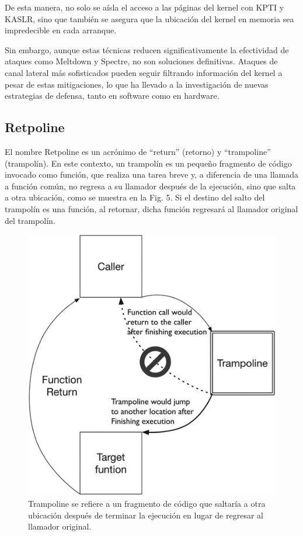 \documentclass[lettersize,compsoc]{IEEEtran}
\begin{document}
De esta manera, no solo se aísla el acceso a las páginas del kernel con KPTI y KASLR, sino que también se asegura que la ubicación del kernel en memoria sea impredecible en cada arranque.

Sin embargo, aunque estas técnicas reducen significativamente la efectividad de ataques como Meltdown y Spectre, no son soluciones definitivas. Ataques de canal lateral más sofisticados pueden seguir filtrando información del kernel a pesar de estas mitigaciones, lo que ha llevado a la investigación de nuevas estrategias de defensa, tanto en software como en hardware.

\subsection{Retpoline} El nombre Retpoline es un acrónimo de “return” (retorno) y “trampoline” (trampolín). En este contexto, un trampolín es un pequeño fragmento de código invocado como función, que realiza una tarea breve y, a diferencia de una llamada a función común, no regresa a su llamador después de la ejecución, sino que salta a otra ubicación, como se muestra en la Fig. 5. Si el destino del salto del trampolín es una función, al retornar, dicha función regresará al llamador original del trampolín.\cite{retpoline1}\cite{retpoline2}

\begin{figure}[h] \centering \includegraphics[width=\linewidth]{retpoline.jpg} \caption{\small Trampoline se refiere a un fragmento de código que saltaría a otra ubicación después de terminar la ejecución en lugar de regresar al llamador original.} \end{figure}
\end{document}
